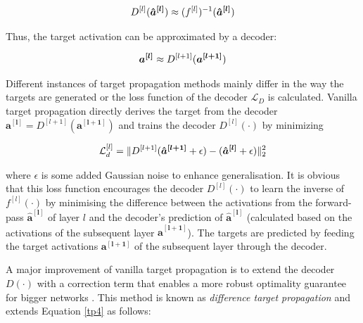 \begin{align}\eqlbl{tp3}
	D^{[l]}(\boldsymbol{\hat{a}^{[l]}}) \approx  (f^{[l]})^{-1}(\boldsymbol{\hat{a}^{[l]}})
\end{align}

Thus, the target activation can be approximated by a decoder:

\begin{align}\eqlbl{tp4}
	\boldsymbol{a^{[l]}} \approx D^{[l+1]}(\boldsymbol{a^{[l+1]}}) 
\end{align}



Different instances of target propagation methods mainly differ in the way the targets are generated or the loss function of the decoder $\mathcal{L}_{D}$ is calculated.
Vanilla target propagation  directly derives the target from the decoder $\boldsymbol{a^{[l]}} = D^{[l+1]}(\boldsymbol{a^{[l+1]}}) $ and trains the decoder $D^{[l]}(\cdot)$ by minimizing

\begin{align}\eqlbl{tp5}
	\mathcal{L}^{[l]}_{d} = \lVert D^{[l+1]}(\boldsymbol{\hat{a}^{[l+1]}} + \epsilon) - (\boldsymbol{\hat{a}^{[l]}} + \epsilon) \rVert_2^2
\end{align}

where $\epsilon$ is some added Gaussian noise to enhance generalisation.
It is obvious that this loss function encourages the decoder $D^{[l]}(\cdot)$ to learn the inverse of $f^{[l]}(\cdot)$ by minimising the difference between the activations from the forward-pass $\boldsymbol{\hat{a}^{[l]}}$ of layer $l$ and the decoder's prediction of $\boldsymbol{\hat{a}^{[l]}}$ (calculated based on the activations of the subsequent layer $\boldsymbol{\hat{a}^{[l+1]}}$).
The targets are predicted by feeding the target activations $\boldsymbol{a^{[l+1]}}$ of the subsequent layer through the decoder.

A major improvement of vanilla target propagation is to extend the decoder $D(\cdot)$ with a correction term that enables a more robust optimality guarantee for bigger networks .
This method is known as \emph{difference target propagation} and extends Equation \eqref*{tp4} as follows:

